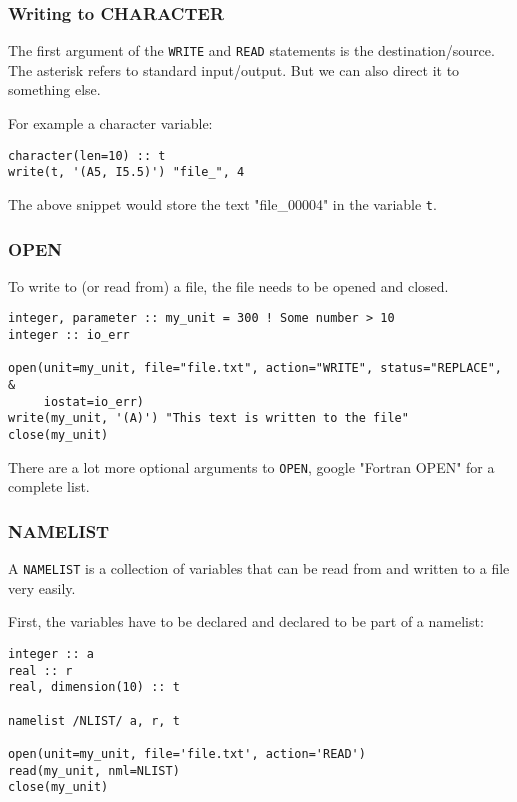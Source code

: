 \begin{frame}[fragile]
  \frametitle{Writing to CHARACTER}

  The first argument of the \texttt{WRITE} and \texttt{READ} statements is the 
  destination/source.
  The asterisk refers to standard input/output.
  But we can also direct it to something else.

  For example a character variable:

  \begin{lstlisting}
character(len=10) :: t
write(t, '(A5, I5.5)') "file_", 4
  \end{lstlisting}

  The above snippet would store the text "file\_00004" in the variable \texttt{t}.

\end{frame}

\begin{frame}[fragile]
  \frametitle{OPEN}

  To write to (or read from) a file, the file needs to be opened and closed.

  \begin{lstlisting}
integer, parameter :: my_unit = 300 ! Some number > 10
integer :: io_err

open(unit=my_unit, file="file.txt", action="WRITE", status="REPLACE", &
     iostat=io_err)
write(my_unit, '(A)') "This text is written to the file"
close(my_unit)
  \end{lstlisting}

  There are a lot more optional arguments to \texttt{OPEN}, google "Fortran OPEN" for a complete list.

\end{frame}

\begin{frame}[fragile]
  \frametitle{NAMELIST}

  A \texttt{NAMELIST} is a collection of variables that can be read from and
  written to a file very easily.

  First, the variables have to be declared and declared to be part of a namelist:

  \begin{lstlisting}
integer :: a
real :: r
real, dimension(10) :: t

namelist /NLIST/ a, r, t

open(unit=my_unit, file='file.txt', action='READ')
read(my_unit, nml=NLIST)
close(my_unit)
  \end{lstlisting}

\end{frame}

